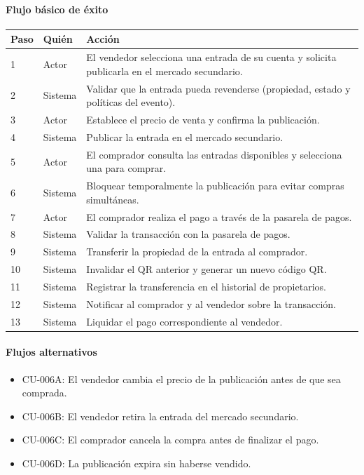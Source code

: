 \paragraph{Flujo básico de éxito}
\begin{longtable}{P{1.1cm}P{1.8cm}P{10.5cm}}
\toprule
\textbf{Paso} & \textbf{Quién} & \textbf{Acción}\\
\midrule
{} & Actor & El vendedor selecciona una entrada de su cuenta y solicita publicarla en el mercado secundario.\\
2 & Sistema & Validar que la entrada pueda revenderse (propiedad, estado y políticas del evento).\\
3 & Actor & Establece el precio de venta y confirma la publicación.\\
4 & Sistema & Publicar la entrada en el mercado secundario.\\
5 & Actor & El comprador consulta las entradas disponibles y selecciona una para comprar.\\
6 & Sistema & Bloquear temporalmente la publicación para evitar compras simultáneas.\\
7 & Actor & El comprador realiza el pago a través de la pasarela de pagos.\\
8 & Sistema & Validar la transacción con la pasarela de pagos.\\
9 & Sistema & Transferir la propiedad de la entrada al comprador.\\
10 & Sistema & Invalidar el QR anterior y generar un nuevo código QR.\\
11 & Sistema & Registrar la transferencia en el historial de propietarios.\\
12 & Sistema & Notificar al comprador y al vendedor sobre la transacción.\\
13 & Sistema & Liquidar el pago correspondiente al vendedor.\\
\bottomrule
\end{longtable}

\paragraph{Flujos alternativos}
\begin{itemize}[leftmargin=1.4em, topsep=1pt]
  \item CU-006A: El vendedor cambia el precio de la publicación antes de que sea comprada.
  \item CU-006B: El vendedor retira la entrada del mercado secundario.
  \item CU-006C: El comprador cancela la compra antes de finalizar el pago.
  \item CU-006D: La publicación expira sin haberse vendido.
\end{itemize}

